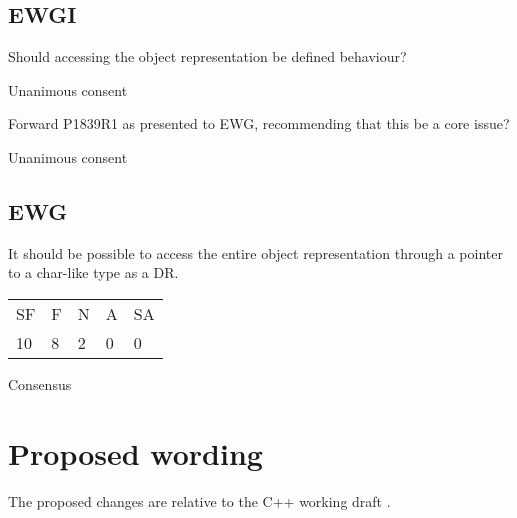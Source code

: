 \subsection*{EWGI}

Should accessing the object representation be defined behaviour?

\hspace{6mm}Unanimous consent

Forward P1839R1 as presented to EWG, recommending that this be a core issue?

\hspace{6mm}Unanimous consent

\subsection*{EWG}

It should be possible to access the entire object representation through a pointer to a char-like type as a DR.

\hspace{6mm}
\begin{tabular}{lllll}
  SF & F & N & A & SA \\
  10 & 8 & 2 & 0 & 0
\end{tabular}
\hspace{5mm}Consensus

\section{Proposed wording}
\label{sec:wording}

The proposed changes are relative to the C++ working draft \cite{N4910}. 


